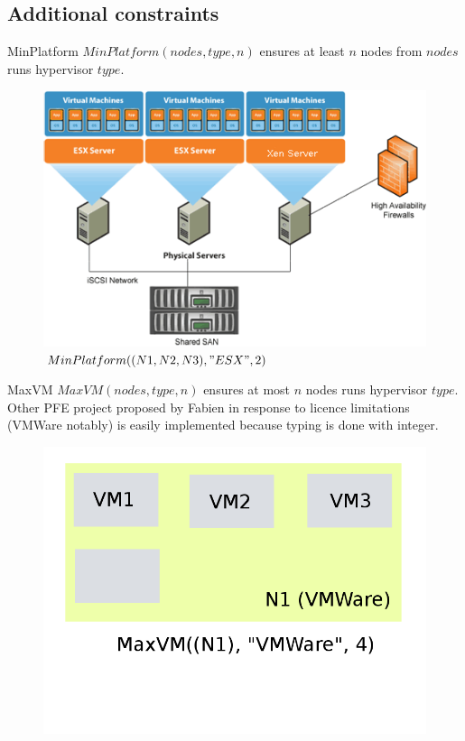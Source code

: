 \documentclass{beamer}
\begin{document}
\subsection{Additional constraints}
\begin{frame}{MinPlatform}
$MinPlatform(nodes, type, n)$ ensures at least $n$ nodes from $nodes$ runs
hypervisor $type$.
\begin{figure}[!ht]
	\centering
	\includegraphics[scale=.4]{imgs/samplecloud.png}
	\caption{$MinPlatform((N1,N2,N3), "ESX", 2)$}
\end{figure}
\end{frame}
\begin{frame}{MaxVM}
$MaxVM(nodes, type, n)$ ensures at most $n$ nodes runs hypervisor $type$.\\
 Other PFE project proposed by Fabien in response to licence limitations
(VMWare notably) is easily implemented because typing is done with integer.
\begin{figure}[!ht]
	\centering
	\includegraphics[scale=.3]{imgs/maxvm.png}
\end{figure}
\end{frame}
\end{document}
